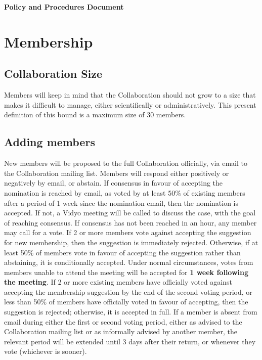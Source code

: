 

\centerline{\textbf{Policy and Procedures Document}}\bigskip 


\section{Membership}

\subsection{Collaboration Size}

Members will keep in mind that the Collaboration should not grow to a size that makes it difficult to manage, either scientifically or administratively.  This present definition of this bound is a maximum size of 30 members.

\subsection{Adding members}

New members will be proposed to the full Collaboration officially, via email to the Collaboration mailing list.  Members will respond either positively or negatively by email, or abstain.  If consensus in favour of accepting the nomination is reached by email, as voted by at least 50\% of existing members after a period of 1 week since the nomination email, then the nomination is accepted.  If not, a Vidyo meeting will be called to discuss the case, with the goal of reaching consensus.  If consensus has not been reached in an hour, any member may call for a vote.  If 2 or more members vote against accepting the suggestion for new membership, then the suggestion is immediately rejected.  Otherwise, if at least 50\% of members vote in favour of accepting the suggestion rather than abstaining, it is conditionally accepted.  Under normal circumstances, votes from members unable to attend the meeting will be accepted for \textbf{1 week following the meeting}.  If 2 or more existing members have officially voted against accepting the membership suggestion by the end of the second voting period, or less than 50\% of members have officially voted in favour of accepting, then the suggestion is rejected; otherwise, it is accepted in full.  If a member is absent from email during either the first or second voting period, either as advised to the Collaboration mailing list or as informally advised by another member, the relevant period will be extended until 3 days after their return, or whenever they vote (whichever is sooner).

